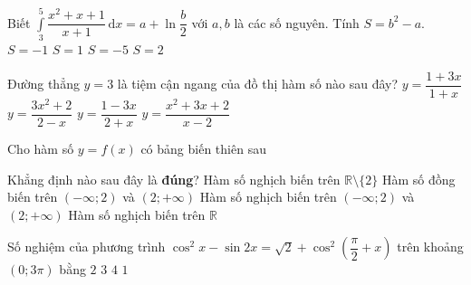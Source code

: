 \begin{ex}%
	Biết $\displaystyle\int\limits_3^5\dfrac{x^2+x+1}{x+1}\mathrm{\,d}x=a+\ln\dfrac{b}{2}$ với $a,b$ là các số  nguyên. Tính $S=b^2-a$.
	\choice
	{$S=-1$}
	{\True $S=1$}
	{$S=-5$}
	{$S=2$}
\end{ex}

\begin{ex}%
	Đường thẳng $y=3$ là tiệm cận ngang của đồ thị hàm số nào sau đây?
	\choice
	{\True $y=\dfrac{1+3x}{1+x}$}
	{$y=\dfrac{3x^2+2}{2-x}$}
	{$y=\dfrac{1-3x}{2+x}$}
	{$y=\dfrac{x^2+3x+2}{x-2}$}
\end{ex}

\begin{ex}%
	Cho hàm số $y=f(x)$ có bảng biến thiên sau
	\begin{center}
	\end{center}
	Khẳng định nào sau đây là \textbf{đúng}?
	\choice
	{Hàm số nghịch biến trên $\mathbb{R}\setminus\lbrace 2\rbrace$}
	{Hàm số đồng biến trên $\left(-\infty; 2\right)$ và $\left(2; +\infty\right)$}
	{\True Hàm số nghịch biến trên $\left(-\infty; 2\right)$ và $\left(2; +\infty\right)$}
	{Hàm số nghịch biến trên $\mathbb{R}$}
\end{ex}


\begin{ex}%
	Số nghiệm của phương trình $\cos^2x-\sin 2x=\sqrt{2}+\cos^2\left(\dfrac{\pi}{2}+x\right)$ trên khoảng $\left(0; 3\pi\right)$ bằng
	\choice
	{$2$}
	{\True $3$}
	{$4$}
	{$1$}
\end{ex}


